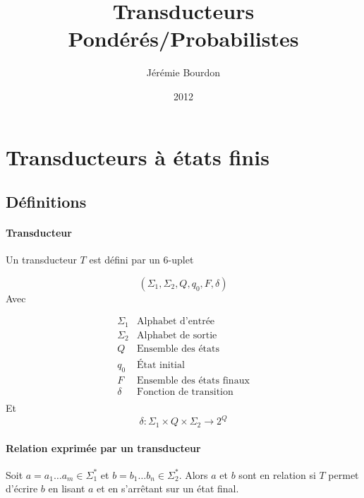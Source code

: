 \documentclass[a4paper, 12pt, fleqn]{article}
\title{Transducteurs Pondérés/Probabilistes}
\author{Jérémie Bourdon}
\date{2012}
\begin{document}
\maketitle

\section{Transducteurs à états finis}
\label{sec:transd-etats-finis}

\subsection{Définitions}
\label{sec:definition}

\paragraph{Transducteur}
\label{sec:transducteur-t}



Un transducteur $T$ est défini par un 6-uplet

\begin{equation*}
  (\Sigma_1, \Sigma_2, Q, q_0, F, \delta)
\end{equation*}
Avec

\begin{equation*}
  \begin{array}{r|l}
    \Sigma_1 & \text{Alphabet d'entrée}         \\
    \Sigma_2 & \text{Alphabet de sortie}        \\
    Q        & \text{Ensemble des états}        \\
    q_0      & \text{État initial}              \\
    F        & \text{Ensemble des états finaux} \\
    \delta   & \text{Fonction de transition}    \\
  \end{array}
\end{equation*}
Et
\begin{equation*}
  \delta: \Sigma_1 \times Q \times \Sigma_2 \rightarrow 2^Q
\end{equation*}

\paragraph{Relation exprimée par un transducteur}
\label{sec:relat-expr-par}

Soit $a = a_1 \dots a_m \in \Sigma_1^*$ et $b = b_1 \dots b_n \in
\Sigma_2^*$. Alors $a$ et $b$ sont en relation si $T$ permet d'écrire
$b$ en lisant $a$ et en s'arr\^etant sur un état final.
\end{document}
